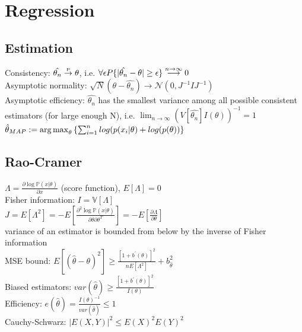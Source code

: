 \section{Regression}
\subsection*{Estimation}
Consistency: $\hat{\theta_n} \stackrel{\text{\tiny P}}{\rightarrow} \theta$,
i.e. $\forall\epsilon P \{|\hat{\theta_n}-\theta| \geq\epsilon\} \stackrel{\tiny n \to\infty}{\longrightarrow} 0 $\\
Asymptotic normality: $\sqrt{N}(\theta - \hat{\theta_n}) \to \mathcal{N}(0, J^{-1}IJ^{-1})$ \\
Asymptotic efficiency: $\hat{\theta_n}$ has the smallest variance among all possible consistent estimators (for large enough N), i.e. $\lim_{n\to\infty} (V[\hat{\theta_n}]I(\theta))^{-1} = 1$
	$\hat{\theta}_{MAP} := \operatorname*{arg\,max}_\theta \left \{ \sum_{i=1}^n log(p(x_i | \theta) + log(p(\theta)) \right\}$
\subsection*{Rao-Cramer}
$\Lambda = \frac{\partial \log \mathbb{P}(x|\theta )}{\partial x}$ (score function), $E[\Lambda ]=0$\\
Fisher information: $I= \mathbb{V}[\Lambda]$ \\
$J= E[\Lambda^{2}]= -E[\frac{\partial^2 \log \mathbb{P}(x|\theta ) }{\partial \theta \partial \theta ^{T}}]= -E[\frac{\partial \Lambda}{\partial \theta}]$ \\
variance of an estimator is bounded from below by the inverse of Fisher information \\
MSE bound: $E[(\hat \theta -\theta )^{2}] \geq \frac{[1 + b^{\prime} (\theta)]^{2}}{n E[\Lambda ^{2}]} + b_{\hat \theta}^{2}$ \\
Biased estimators: $var(\hat{\theta}) \geq \frac{[1 + b^{\prime}(\theta)]^2}{I(\theta)}$ \\
Efficiency: $e(\hat{\theta}) = \frac{I(\theta)^{-1}}{var(\hat{\theta})} \leq 1$ \\
Cauchy-Schwarz: $|E(X,Y)|^2 \leq E(X)^2 E(Y)^2$ 

